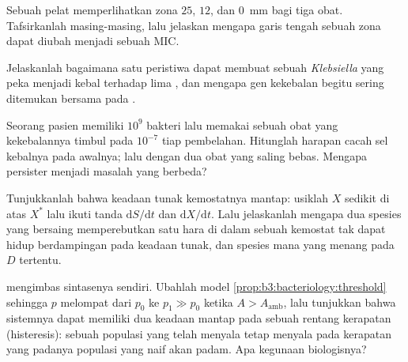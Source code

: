 \begin{exercise}[$\star\star$]\label{exo:b3:bacteriology:7}
Sebuah pelat  memperlihatkan zona $25$, $12$, dan \qty{0}{mm} bagi
tiga obat. Tafsirkanlah masing-masing, lalu jelaskan mengapa garis tengah
sebuah zona dapat diubah menjadi sebuah MIC.
\end{exercise}

\begin{exercise}[$\star\star$]\label{exo:b3:bacteriology:8}
Jelaskanlah bagaimana satu peristiwa  dapat membuat sebuah
\emph{Klebsiella} yang peka menjadi kebal terhadap lima , dan mengapa
gen kekebalan begitu sering ditemukan bersama pada .
\end{exercise}

\begin{exercise}[$\star\star$]\label{exo:b3:bacteriology:9}
Seorang pasien memiliki $10^{9}$ bakteri lalu memakai sebuah obat yang
kekebalannya timbul pada $10^{-7}$ tiap pembelahan. Hitunglah harapan cacah
sel kebalnya pada awalnya; lalu dengan dua obat yang saling bebas. Mengapa
persister menjadi masalah yang berbeda?
\end{exercise}

\begin{exercise}[$\star\star\star$]\label{exo:b3:bacteriology:10}
Tunjukkanlah bahwa keadaan tunak kemostatnya mantap: usiklah $X$ sedikit
di atas $X^{*}$ lalu ikuti tanda $\mathrm{d}S/\mathrm{d}t$ dan
$\mathrm{d}X/\mathrm{d}t$. Lalu jelaskanlah mengapa dua spesies yang bersaing
memperebutkan satu hara di dalam sebuah kemostat tak dapat hidup berdampingan
pada keadaan tunak, dan spesies mana yang menang pada $D$ tertentu.
\end{exercise}

\begin{exercise}[$\star\star\star$]\label{exo:b3:bacteriology:11}
 mengimbas sintasenya sendiri. Ubahlah model
\cref{prop:b3:bacteriology:threshold} sehingga $p$ melompat dari $p_{0}$ ke
$p_{1} \gg p_{0}$ ketika $A > A_{\text{amb}}$, lalu tunjukkan bahwa sistemnya
dapat memiliki dua keadaan mantap pada sebuah rentang kerapatan (histeresis):
sebuah populasi yang telah menyala tetap menyala pada kerapatan yang padanya
populasi yang naif akan padam. Apa kegunaan biologisnya?
\end{exercise}

